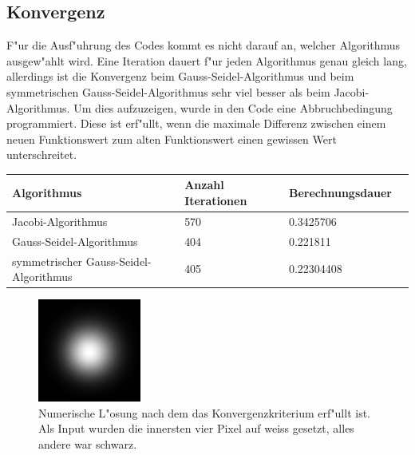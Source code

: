 \begin{refsection}
\subsection{Konvergenz}
F"ur die Ausf"uhrung des Codes kommt es nicht darauf an, welcher
Algorithmus ausgew"ahlt wird. Eine Iteration dauert f"ur jeden
Algorithmus genau gleich lang, allerdings ist die Konvergenz beim
Gauss-Seidel-Algorithmus und beim symmetrischen Gauss-Seidel-Algorithmus
sehr viel besser als beim Jacobi-Algorithmus. Um dies aufzuzeigen,
wurde in den Code eine Abbruchbedingung programmiert. Diese ist erf"ullt,
wenn die maximale Differenz zwischen einem neuen Funktionswert zum alten
Funktionswert einen gewissen Wert unterschreitet.

\begin{center}
\begin{tabular}{ | l | l | l | p{5cm} |}
\hline
\textbf{Algorithmus} & \textbf{Anzahl Iterationen} & \textbf{Berechnungsdauer} \\ \hline
Jacobi-Algorithmus & 570 & 0.3425706 \\ \hline
Gauss-Seidel-Algorithmus & 404 & 0.221811 \\ \hline
symmetrischer Gauss-Seidel-Algorithmus & 405 & 0.22304408\\
\hline
\end{tabular}
\end{center}

\begin{figure}
\centering 
\includegraphics[width=0.6\hsize]{potential/images/konvergenz/konvergenz.jpg}
\caption{Numerische L"osung nach dem das Konvergenzkriterium erf"ullt ist.
Als Input wurden die innersten vier Pixel auf weiss gesetzt, alles andere war
schwarz.}
\label{konvergenz}
\end{figure}


\end{refsection}
